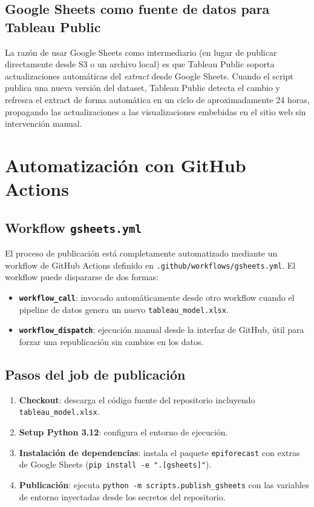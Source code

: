 \documentclass[12pt, letterpaper]{article}
\begin{document}
\subsection{Google Sheets como fuente de datos para Tableau Public}

La razón de usar Google Sheets como intermediario (en lugar de publicar directamente desde S3 o un archivo local) es que Tableau Public soporta actualizaciones automáticas del \textit{extract} desde Google Sheets. Cuando el script publica una nueva versión del dataset, Tableau Public detecta el cambio y refresca el extract de forma automática en un ciclo de aproximadamente 24 horas, propagando las actualizaciones a las visualizaciones embebidas en el sitio web sin intervención manual.

\newpage
\section{Automatización con GitHub Actions}\label{sec:ci}

\subsection{Workflow \texttt{gsheets.yml}}

El proceso de publicación está completamente automatizado mediante un workflow de GitHub Actions definido en \texttt{.github/workflows/gsheets.yml}. El workflow puede dispararse de dos formas:

\begin{itemize}[noitemsep]
    \item \textbf{\texttt{workflow\_call}}: invocado automáticamente desde otro workflow cuando el pipeline de datos genera un nuevo \texttt{tableau\_model.xlsx}.
    \item \textbf{\texttt{workflow\_dispatch}}: ejecución manual desde la interfaz de GitHub, útil para forzar una republicación sin cambios en los datos.
\end{itemize}

\subsection{Pasos del job de publicación}

\begin{enumerate}[noitemsep]
    \item \textbf{Checkout}: descarga el código fuente del repositorio incluyendo \texttt{tableau\_model.xlsx}.
    \item \textbf{Setup Python 3.12}: configura el entorno de ejecución.
    \item \textbf{Instalación de dependencias}: instala el paquete \texttt{epiforecast} con extras de Google Sheets (\texttt{pip install -e ".[gsheets]"}).
    \item \textbf{Publicación}: ejecuta \texttt{python -m scripts.publish\_gsheets} con las variables de entorno inyectadas desde los secretos del repositorio.
\end{enumerate}
\end{document}
